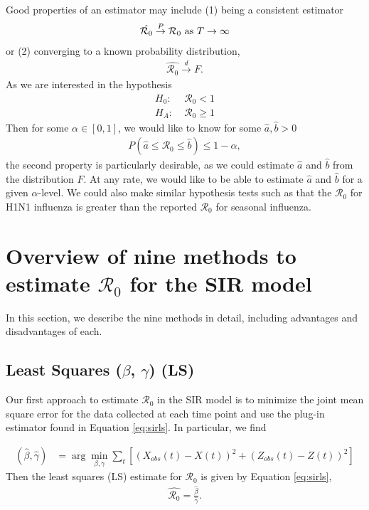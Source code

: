 \documentclass[12pt]{article}
\newcommand{\wxxsir}{nine } %
\newcommand{\rr}{\ensuremath{\mathcal{R}_0}}
\begin{document}
Good properties of an estimator may include (1) being a consistent estimator
\begin{align*}
  \hat{\rr} \overset{P}{\to} \rr \textnormal{ as } T\to \infty
\end{align*}
or (2) converging to a known probability distribution,
\begin{align*}
\hat{\rr} \overset{d}{\to} F.  
\end{align*}
As we are interested in the hypothesis
\begin{align*}
  H_0:\;& \rr < 1 \\
  H_A:\;& \rr \ge 1
\end{align*}
Then for some $\alpha \in [0,1]$, we would like to know for some $\hat{a}, \hat{b} >0$
\begin{align*}
P(\hat{a} \le \rr \le \hat{b}) \le 1 - \alpha,  
\end{align*}
the second property is particularly desirable, as we could estimate $\hat{a}$ and $\hat{b}$ from the distribution $F$.  At any rate, we would like to be able to estimate $\hat{a}$ and $\hat{b}$ for a given $\alpha$-level.  We could also make similar hypothesis tests such as that the $\rr$ for H1N1 influenza is greater than the reported $\rr$ for seasonal influenza.

\section{Overview of \wxxsir methods to estimate $\rr$ for the SIR model}
\label{sec:methods} 

In this section, we describe the \wxxsir methods in detail, including advantages and disadvantages of each.

\subsection{Least Squares ($\beta$, $\gamma$) (LS)}\label{least-squares-beta-gamma}
Our first approach to estimate $\rr$ in the SIR model is to minimize the joint mean square error for the data collected at each time point and use the plug-in estimator found in Equation \ref{eq:sirls}.  In particular, we find

\begin{align*}
(\hat{\beta}, \hat{\gamma} )&=\arg \min_{\beta, \gamma} \sum_{t} \left [ \left (X_{obs}(t) - X(t)\right )^2 + \left ( Z_{obs}(t) - Z(t) \right )^2 \right ]
\end{align*}
Then the least squares (LS) estimate for $\rr$ is given by Equation \ref{eq:sirls},
\begin{align}\label{eq:sirls}
  \hat{\rr}= \frac{\hat{\beta}}{\hat{\gamma}}.
\end{align}
\end{document}
